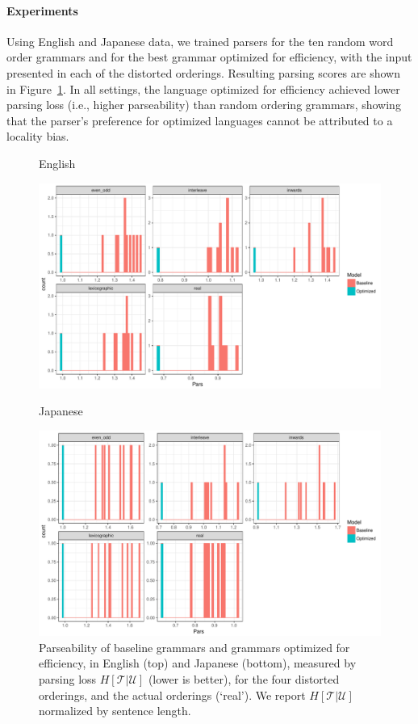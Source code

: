 \documentclass[10pt,twoside,lineno]{article}
\newcommand{\utterance}{\mathcal{U}}
\newcommand{\tree}{\mathcal{T}}
\begin{document}
\paragraph{Experiments}
Using English and Japanese data, we trained parsers for the ten random word order grammars and for the best grammar optimized for efficiency, with the input presented in each of the distorted orderings.
Resulting parsing scores are shown in Figure~\ref{fig:distorted-parser}.
In all settings, the language optimized for efficiency achieved lower parsing loss (i.e., higher parseability) than random ordering grammars, showing that the parser's preference for optimized languages cannot be attributed to a locality bias.

\begin{figure}
    \centering
    English
    
    \includegraphics[scale=.5]{../results/permuted/adversarial-parse-loss-english.pdf}
    
    Japanese
    
    \includegraphics[scale=.5]{../results/permuted/adversarial-parse-loss-japanese.pdf}
	\caption{Parseability of baseline grammars and grammars optimized for efficiency, in English (top) and Japanese (bottom), measured by parsing loss $H[\tree|\utterance]$ (lower is better), for the four distorted orderings, and the actual orderings (`real'). We report $H[\tree|\utterance]$ normalized by sentence length.}
    \label{fig:distorted-parser}
\end{figure}
\end{document}
